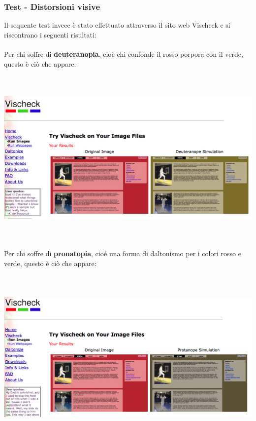 	\subsubsection {Test - Distorsioni visive}
	Il sequente test invece \`e  stato effettuato attraverso il sito web Vischeck e si riscontrano i seguenti risultati:
	\\
	\\ Per chi soffre di \textbf{deuteranopia}, cio\`e chi confonde il rosso porpora con il verde, questo \`e ci\`o che appare:
	\\
	\\ \includegraphics[width=150mm, height=85mm]{images/contrasto_pagina_deuteranope.png}	
	\\
	\\ Per chi soffre di \textbf{pronatopia}, cio\'e una forma di daltonismo per i colori rosso e verde,  questo \`e ci\`o che appare:
	\\
	\\ \includegraphics[width=150mm, height=85mm]{images/contrasto_pagina_protanope.png}
